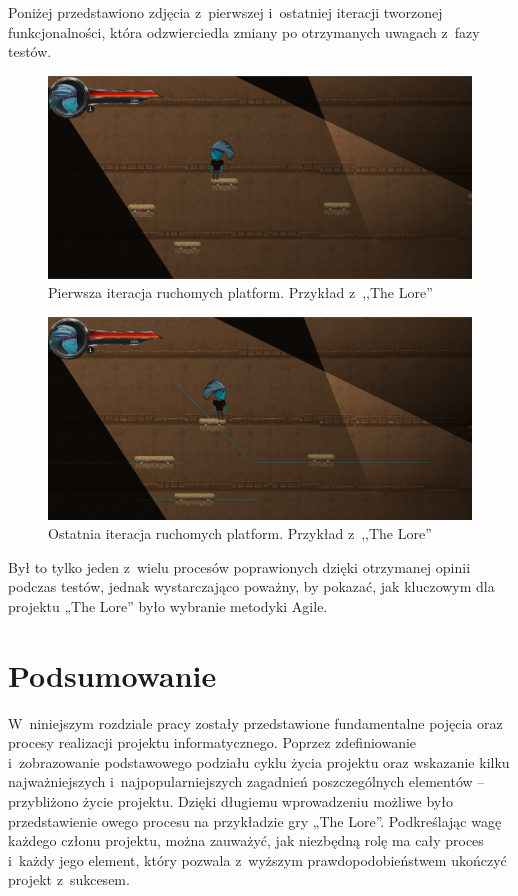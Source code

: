 \documentclass[oneside,polski,logo]{amuthesis}
\begin{document}
Poniżej przedstawiono zdjęcia z~pierwszej i~ostatniej iteracji tworzonej funkcjonalności, która odzwierciedla zmiany po otrzymanych uwagach z~fazy testów.
\newpage
\begin{figure}[h]
	\centering
	\includegraphics[width=13cm]{images/hyps/platfBef.png}
	\caption{Pierwsza iteracja ruchomych platform. Przykład z~,,The Lore''}
\end{figure}

\begin{figure}[h!]
	\centering
	\includegraphics[width=13cm]{images/hyps/platfAfter.png}
	\caption{Ostatnia iteracja ruchomych platform. Przykład z~,,The Lore''}
\end{figure}

Był to tylko jeden z~wielu procesów poprawionych dzięki otrzymanej opinii podczas testów, jednak wystarczająco poważny, by pokazać, jak kluczowym dla projektu „The Lore” było wybranie metodyki Agile.
\newpage
\section{Podsumowanie}
W~niniejszym rozdziale pracy zostały przedstawione fundamentalne pojęcia oraz procesy realizacji projektu informatycznego. Poprzez zdefiniowanie i~zobrazowanie podstawowego podziału cyklu życia projektu oraz wskazanie kilku najważniejszych i~najpopularniejszych zagadnień poszczególnych elementów – przybliżono życie projektu. Dzięki długiemu wprowadzeniu możliwe było przedstawienie owego procesu na przykładzie gry „The Lore”. Podkreślając wagę każdego członu projektu, można zauważyć, jak niezbędną rolę ma cały proces i~każdy jego element, który pozwala z~wyższym prawdopodobieństwem ukończyć projekt z~sukcesem.
\end{document}
